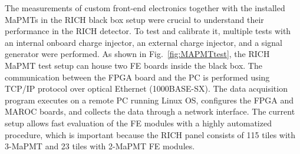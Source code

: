 




The measurements of custom front-end electronics together with the installed MaPMTs in the RICH black box setup were crucial to understand their performance in the RICH detector.
To test and calibrate it, multiple tests with an internal onboard charge injector, an external charge injector, and a signal generator were performed.
As shown in Fig.~\ref{fig:MAPMTtest}, the RICH MaPMT test setup can house two FE boards inside the black box.
The communication between the FPGA board and the PC is performed using TCP/IP protocol over optical Ethernet (1000BASE-SX).
The data acquisition program executes on a remote PC running Linux OS, configures the FPGA and MAROC boards, and collects the data through a network interface.
The current setup allows fast evaluation of the FE modules with a highly automatized procedure, which is important because the RICH panel consists of 115 tiles with 3-MaPMT and 23 tiles with 2-MaPMT FE modules.
